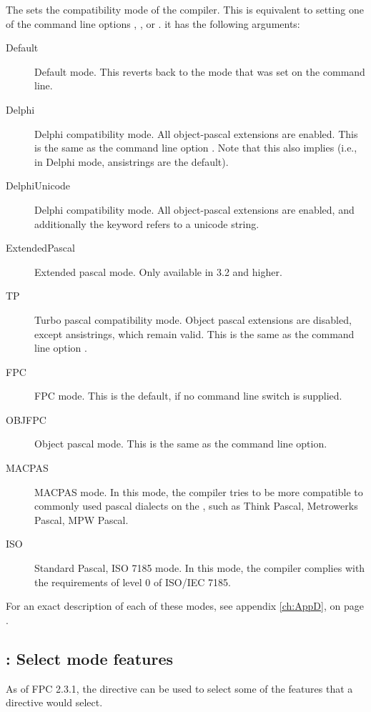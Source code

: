 The  sets the compatibility mode of the compiler. This
is equivalent to setting one of the command line options ,
,  or . it has the following arguments:
\begin{description}
\item[Default] Default mode. This reverts back to the mode that was set on
the command line.
\item[Delphi] Delphi compatibility mode. All object-pascal extensions are
enabled. This is the same as the command line option . Note that
this also implies  (i.e., in Delphi mode, ansistrings are
the default).
\item[DelphiUnicode] Delphi compatibility mode. All object-pascal extensions are
enabled, and additionally the  keyword refers to a unicode
string. 
\item[ExtendedPascal] Extended pascal mode. Only available in 3.2 and
higher.
\item[TP] Turbo pascal compatibility mode. Object pascal extensions are
disabled, except ansistrings, which remain valid.
This is the same as the command line option .
\item[FPC] FPC mode. This is the default, if no command line switch is
supplied.
\item[OBJFPC] Object pascal mode. This is the same as the 
command line option.
\item[MACPAS] MACPAS mode. In this mode, the compiler tries to be more compatible
to commonly used pascal dialects on the \macos, such as Think Pascal, Metrowerks 
Pascal, MPW Pascal. 
\item[ISO] Standard Pascal, ISO 7185 mode. In this mode, the compiler complies 
with the requirements of level 0 of ISO/IEC 7185.
\end{description}

For an exact description of each of these modes, see appendix \ref{ch:AppD},
on page \pageref{ch:AppD}.

\subsection{ : Select mode features}
As of FPC 2.3.1, the  directive can be used to select 
some of the features that a  directive would select.

